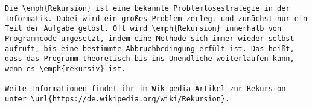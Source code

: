 \begin{verbatim}
Die \emph{Rekursion} ist eine bekannte Problemlösestrategie in der Informatik. Dabei wird ein großes Problem zerlegt und zunächst nur ein Teil der Aufgabe gelöst. Oft wird \emph{Rekursion} innerhalb von Programmcode umgesetzt, indem eine Methode sich immer wieder selbst aufruft, bis eine bestimmte Abbruchbedingung erfült ist. Das heißt, dass das Programm theoretisch bis ins Unendliche weiterlaufen kann, wenn es \emph{rekursiv} ist.
	
Weite Informationen findet ihr im Wikipedia-Artikel zur Rekursion unter \url{https://de.wikipedia.org/wiki/Rekursion}.
\end{verbatim}
